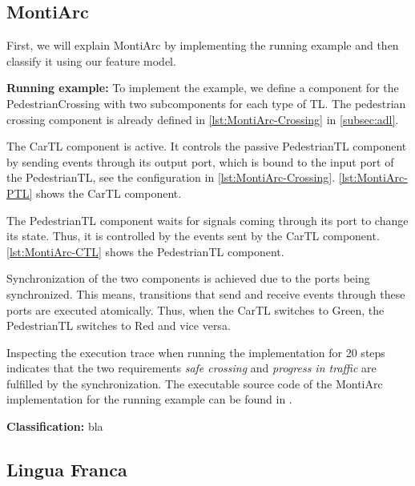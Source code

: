 \documentclass[runningheads]{llncs}
\begin{document}
\subsection{MontiArc} \label{subsec:montiArc}
First, we will explain MontiArc by implementing the running example and then classify it using our feature model.

\textbf{Running example:} To implement the example, we define a component for the \textsf{PedestrianCrossing} with two subcomponents for each type of TL.
The pedestrian crossing component is already defined in \autoref{lst:MontiArc-Crossing} in \autoref{subsec:adl}.

The \textsf{CarTL} component is active.
It controls the passive \textsf{PedestrianTL} component by sending events through its output port, which is bound to the input port of the \textsf{PedestrianTL}, see the configuration in \autoref{lst:MontiArc-Crossing}.
\autoref{lst:MontiArc-PTL} shows the \textsf{CarTL} component.



The \textsf{PedestrianTL} component waits for signals coming through its port to change its state.
Thus, it is controlled by the events sent by the \textsf{CarTL} component.
\autoref{lst:MontiArc-CTL} shows the \textsf{PedestrianTL} component.



Synchronization of the two components is achieved due to the ports being synchronized.
This means, transitions that send and receive events through these ports are executed atomically.
Thus, when the \textsf{CarTL} switches to \textsf{Green}, the \textsf{PedestrianTL} switches to \textsf{Red} and vice versa.

Inspecting the execution trace when running the implementation for 20 steps indicates that the two requirements \textit{safe crossing} and \textit{progress in traffic} are fulfilled by the synchronization.
The executable source code of the MontiArc implementation for the running example can be found in \cite{timkrauterArtifactsCoordination2024}.

\textbf{Classification:} bla
\subsection{Lingua Franca} %
\end{document}
